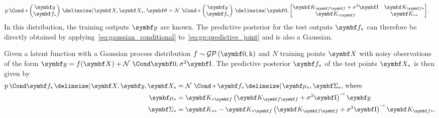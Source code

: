 \begin{align}
    \label{eq:gp:predictive_joint}
    \Prob*{\begin{pmatrix}
            \mat{y} \\
            \mat{f}_\ast
        \end{pmatrix} \given \mat{X}, \mat{X}_\ast, \mat{\theta}} & = \Gaussian*{\begin{pmatrix}
            \mat{y} \\
            \mat{f}_\ast
        \end{pmatrix} \given \mat{0}, \begin{bmatrix}
            \mat{K}_{\mat{f}\mat{f}} + \sigma^2 \Eye & \mat{K}_{\mat{f}\ast} \\
            \mat{K}_{\ast\mat{f}}                    & \mat{K}_{\ast\ast}
        \end{bmatrix}}.
\end{align}
In this distribution, the training outputs $\mat{y}$ are known.
The predictive posterior for the test outputs $\mat{f}_\ast$ can therefore be directly obtained by applying~\cref{eq:gaussian_conditional} to~\cref{eq:gp:predictive_joint} and is also a Gaussian.
\begin{lemma}
    \label{lem:gp:gp_posterior}
    Given a latent function with a Gaussian process distribution $f \sim \GP(\mat{0}, \K)$ and $N$ training points $\mat{X}$ with noisy observations of the form $\mat{y} = f(\mat{X}) + \Gaussian{\mat{0}, \sigma^2 \Eye}$.
    The predictive posterior $\mat{f_\ast}$ of the test points $\mat{X_\ast}$ is then given by
    \begin{align}
        \begin{split}
            \Prob{\mat{f_\ast} \given \mat{X}, \mat{y}, \mat{X_\ast}}
            &= \Gaussian*{\mat{f_\ast} \given \mat{\mu_\ast}, \mat{\Sigma_\ast}} \text{, where} \\
            \mat{\mu}_\ast
            &= \mat{K}_{\ast \mat{f}} \left( \mat{K}_{\mat{f}\mat{f}} + \sigma^2 \Eye \right)\inv \mat{y} \\
            \mat{\Sigma}_\ast
            &= \mat{K}_{\ast\ast} - \mat{K}_{\ast \mat{f}} \left( \mat{K}_{\mat{f}\mat{f}} + \sigma^2 \Eye \right)\inv \mat{K}_{\mat{f}\ast}.
        \end{split}
    \end{align}
\end{lemma}


